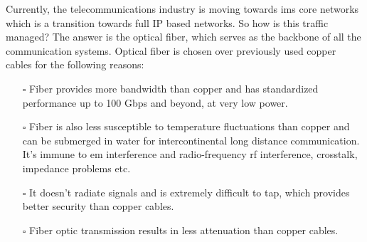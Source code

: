 \documentclass[../report.tex]{subfiles}
\begin{document}
Currently, the telecommunications industry is moving towards \gls{ims} core networks which is a transition towards full IP based networks. So how is this traffic managed? The answer is the optical fiber, which serves as the backbone of all the communication systems. Optical fiber is chosen over previously used copper cables for the following reasons:
\begin{itemize}
	\item[$\square$] Fiber provides more bandwidth than copper and has standardized performance up to 100 Gbps and beyond, at very low power.
	\item[$\square$] Fiber is also less susceptible to temperature fluctuations than copper and can be submerged in water for intercontinental long distance communication. It’s immune to \gls{em} interference and radio-frequency \gls{rf} interference, crosstalk, impedance problems etc. 
	\item[$\square$] It doesn’t radiate signals and is extremely difficult to tap, which provides better security than copper cables.
	\item[$\square$] Fiber optic transmission results in less attenuation than copper cables.
\end{itemize}
\end{document}
